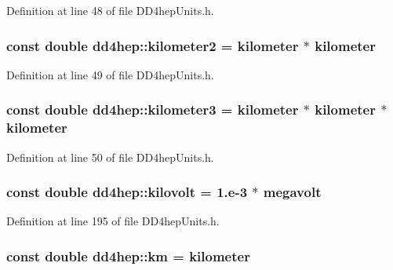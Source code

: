 Definition at line 48 of file DD4hepUnits.h.\hypertarget{namespacedd4hep_a61bb5393f7b8ec3694cb8e522145695f}{
\subsubsection[{kilometer2}]{\setlength{\rightskip}{0pt plus 5cm}const double {\bf dd4hep::kilometer2} = {\bf kilometer} $\ast$ {\bf kilometer}}}
\label{namespacedd4hep_a61bb5393f7b8ec3694cb8e522145695f}


Definition at line 49 of file DD4hepUnits.h.\hypertarget{namespacedd4hep_a4501dea229a9ace2c46c427c69ddb5aa}{
\subsubsection[{kilometer3}]{\setlength{\rightskip}{0pt plus 5cm}const double {\bf dd4hep::kilometer3} = {\bf kilometer} $\ast$ {\bf kilometer} $\ast$ {\bf kilometer}}}
\label{namespacedd4hep_a4501dea229a9ace2c46c427c69ddb5aa}


Definition at line 50 of file DD4hepUnits.h.\hypertarget{namespacedd4hep_a40753aea7e38ef27423508645ac40b19}{
\subsubsection[{kilovolt}]{\setlength{\rightskip}{0pt plus 5cm}const double {\bf dd4hep::kilovolt} = 1.e-\/3 $\ast$ {\bf megavolt}}}
\label{namespacedd4hep_a40753aea7e38ef27423508645ac40b19}


Definition at line 195 of file DD4hepUnits.h.\hypertarget{namespacedd4hep_ab6ce99bfb21ce99b93b69efc2f5ad7a4}{
\subsubsection[{km}]{\setlength{\rightskip}{0pt plus 5cm}const double {\bf dd4hep::km} = {\bf kilometer}}}
\label{namespacedd4hep_ab6ce99bfb21ce99b93b69efc2f5ad7a4}


